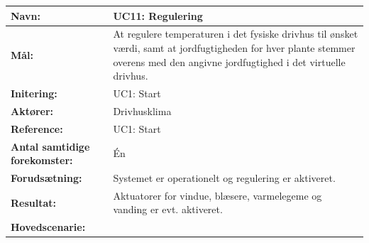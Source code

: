 \clearpage

\begin{table}[h]
\begin{tabularx}{\textwidth}{| >{\raggedright\arraybackslash}p{3.3 cm} | >{\raggedright\arraybackslash}X |} \hline

\textbf{Navn:} 						& UC11: Regulering\\ \hline
\textbf{Mål:}						& At regulere temperaturen i det fysiske drivhus til ønsket værdi, samt at jordfugtigheden for hver plante stemmer overens med den angivne jordfugtighed i det virtuelle drivhus. \\ \hline
\textbf{Initering:}					& UC1: Start \\ \hline
\textbf{Aktører:} 					& Drivhusklima \\ \hline
\textbf{Reference:} 					& UC1: Start \\ \hline
\textbf{Antal samtidige forekomster:} & Én \\ \hline
\textbf{Forudsætning:} 				& Systemet er operationelt og regulering er aktiveret. \\ \hline
\textbf{Resultat:}					& Aktuatorer for vindue, blæsere, varmelegeme og vanding er evt. aktiveret. \\ \hline
\textbf{Hovedscenarie:}				& 


\end{tabularx}
\end{table}
